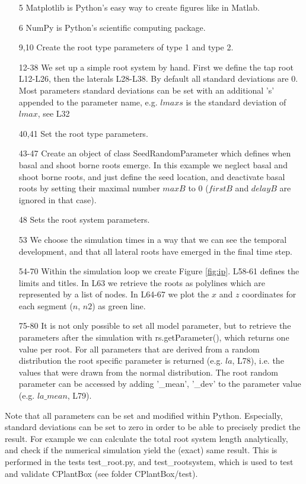\begin{itemize}
\item[5] Matplotlib is Python's easy way to create figures like in Matlab.\item[6] NumPy is Python's scientific computing package.
\item[9,10] Create the root type parameters of type 1 and type 2.
\item[12-38] We set up a simple root system by hand. First we define the tap root L12-L26, then the laterals L28-L38. By default all standard deviations are 0. Most parameters standard deviations can be set with an additional 's' appended to the parameter name, e.g. $lmaxs$ is the standard deviation of $lmax$, see L32
\item[40,41] Set the root type parameters.
\item[43-47] Create an object of class SeedRandomParameter which defines when basal and shoot borne roots emerge. In this example we neglect basal and shoot borne roots, and just define the seed location, and deactivate basal roots by setting their maximal number $maxB$ to 0 ($firstB$ and $delayB$ are ignored in that case). 
\item[48] Sets the root system parameters.
\item[53] We choose the simulation times in a way that we can see the temporal development, and that all lateral roots have emerged in the final time step.
\item[54-70] Within the simulation loop we create Figure \ref{fig:ip}. L58-61 defines the limits and titles. In L63 we retrieve the roots as polylines which are represented by a list of nodes. In L64-67 we plot the $x$ and $z$ coordinates for each segment ($n$, $n2$) as green line. 
\item[75-80] It is not only possible to set all model parameter, 
but to retrieve the parameters after the simulation with rs.getParameter(), which returns one value per root. For all parameters that are derived from a random distribution the root specific parameter is returned (e.g. $la$, L78), i.e. the values that were drawn from the normal distribution. The root random parameter can be accessed by adding '\_mean', '\_dev' to the parameter value (e.g. $la\_mean$, L79).
\end{itemize}

Note that all parameters can be set and modified within Python. Especially, standard deviations can be set to zero in order to be able to precisely predict the result. For example we can calculate the total root system length analytically, and check if the numerical simulation yield the (exact) same result. This is performed in the tests test\_root.py, and test\_rootsystem, which is used to test and validate CPlantBox (see folder CPlantBox/test).

